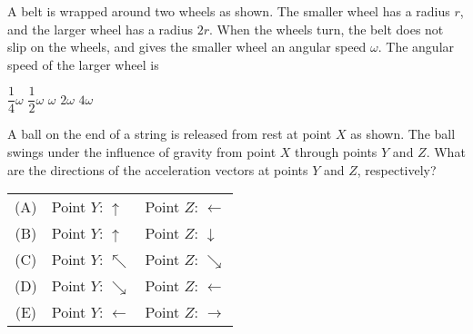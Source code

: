 \documentclass{../../../oss-classkick-exam}
\begin{document}
\begin{multicols*}{2}
\begin{questions}
    
  \question A belt is wrapped around two wheels as shown. The smaller wheel has
    a radius $r$, and the larger wheel has a radius $2r$. When the wheels turn,
    the belt does not slip on the wheels, and gives the smaller wheel an
    angular speed $\omega$. The angular speed of the larger wheel is
    \begin{choices}
      \choice $\dfrac14\omega$
      \choice $\dfrac12\omega$
      \choice $\omega$
      \choice $2\omega$
      \choice $4\omega$
    \end{choices}
    \columnbreak


  \question A ball on the end of a string is released from rest at point $X$ as
    shown. The ball swings under the influence of gravity from point $X$ through
    points $Y$ and $Z$. What are the directions of the acceleration vectors at
    points $Y$ and $Z$, respectively?
    \begin{tabular}{cll}
      (A) & Point $Y$: {\LARGE $\uparrow$} & Point $Z$: {\LARGE $\leftarrow$}\\
      (B) & Point $Y$: {\LARGE $\uparrow$} & Point $Z$: {\LARGE $\downarrow$}\\
      (C) & Point $Y$: {\LARGE $\nwarrow$} & Point $Z$: {\LARGE $\searrow$}\\
      (D) & Point $Y$: {\LARGE $\searrow$} & Point $Z$: {\LARGE $\leftarrow$}\\
      (E) & Point $Y$: {\LARGE $\leftarrow$}&Point $Z$: {\LARGE $\rightarrow$}\\
    \end{tabular}
    \vspace{.7in}
    

\end{questions}
\end{multicols*}
\end{document}

